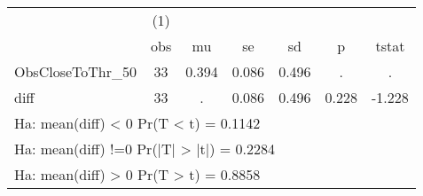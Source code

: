 {
\def\sym#1{\ifmmode^{#1}\else\(^{#1}\)\fi}
\begin{tabular}{l*{1}{cccccc}}
\hline\hline
                    &\multicolumn{1}{c}{(1)}&            &            &            &            &            \\
                    &         obs&          mu&          se&          sd&           p&       tstat\\
\hline
ObsCloseToThr\_50    &          33&       0.394&       0.086&       0.496&           .&           .\\
diff                &          33&           .&       0.086&       0.496&       0.228&      -1.228\\
\hline\hline
\multicolumn{7}{l}{\footnotesize Ha: mean(diff) < 0   Pr(T < t) = 0.1142}\\
\multicolumn{7}{l}{\footnotesize Ha: mean(diff) !=0   Pr(|T| > |t|) = 0.2284}\\
\multicolumn{7}{l}{\footnotesize Ha: mean(diff) > 0   Pr(T > t) = 0.8858}\\
\end{tabular}
}
